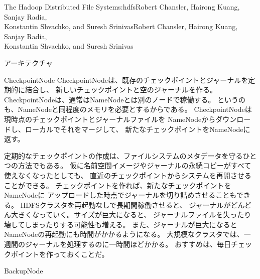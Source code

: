 \begin{aosachaptertoc}{The Hadoop Distributed File System}{s:hdfs}{Robert Chansler, Hairong Kuang, Sanjay Radia, \\ Konstantin Shvachko, and Suresh Srinivas}{Robert Chansler, Hairong Kuang, Sanjay Radia, \\ \hspace*{0.9cm} Konstantin Shvachko, and Suresh Srinivas}
\begin{aosasect1}{アーキテクチャ}
\begin{aosasect2}{CheckpointNode}
CheckpointNodeは、既存のチェックポイントとジャーナルを定期的に結合し、
新しいチェックポイントと空のジャーナルを作る。
CheckpointNodeは、通常はNameNodeとは別のノードで稼働する。
というのも、NameNodeと同程度のメモリを必要とするからである。
CheckpointNodeは現時点のチェックポイントとジャーナルファイルを
NameNodeからダウンロードし、ローカルでそれをマージして、
新たなチェックポイントをNameNodeに返す。

定期的なチェックポイントの作成は、ファイルシステムのメタデータを守るひとつの方法でもある。
仮に名前空間イメージやジャーナルの永続コピーがすべて使えなくなったとしても、
直近のチェックポイントからシステムを再開させることができる。
チェックポイントを作れば、新たなチェックポイントをNameNodeに
アップロードした時点でジャーナルを切り詰めさせることもできる。
HDFSクラスタを再起動なしで長期間稼働させると、
ジャーナルがどんどん大きくなっていく。サイズが巨大になると、
ジャーナルファイルを失ったり壊してしまったりする可能性も増える。
また、ジャーナルが巨大になるとNameNodeの再起動にも時間がかかるようになる。
大規模なクラスタでは、一週間のジャーナルを処理するのに一時間ほどかかる。
おすすめは、毎日チェックポイントを作っておくことだ。

\end{aosasect2}

\begin{aosasect2}{BackupNode}


\end{aosasect2}
\end{aosasect1}
\end{aosachaptertoc}
